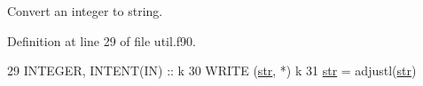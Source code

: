 Convert an integer to string. 



Definition at line 29 of file util.\+f90.


\begin{DoxyCode}
29     \textcolor{keywordtype}{INTEGER}, \textcolor{keywordtype}{INTENT(IN)} :: k
30     \textcolor{keyword}{WRITE} (\hyperlink{namespaceutil_a1df36d0696c9183ceb6bb770f1d88111}{str}, *) k
31     \hyperlink{namespaceutil_a1df36d0696c9183ceb6bb770f1d88111}{str} = adjustl(\hyperlink{namespaceutil_a1df36d0696c9183ceb6bb770f1d88111}{str})
\end{DoxyCode}

